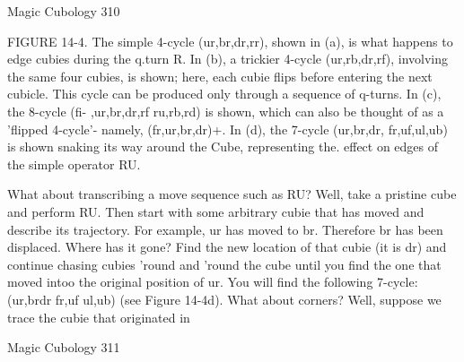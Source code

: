 Magic Cubology                                                                        310

FIGURE 14-4. The simple 4-cycle (ur,br,dr,rr), shown in (a), is what happens to edge
cubies during the q.turn R. In (b), a trickier 4-cycle (ur,rb,dr,rf), involving the same
four cubies, is shown; here, each cubie flips before entering the next cubicle. This
cycle can be produced only through a sequence of q-turns. In (c), the 8-cycle (fi-
,ur,br,dr,rf ru,rb,rd) is shown, which can also be thought of as a 'flipped 4-cycle'-
namely, (fr,ur,br,dr)+. In (d), the 7-cycle (ur,br,dr, fr,uf,ul,ub) is shown snaking its
way around the Cube, representing the. effect on edges of the simple operator RU.

        What about transcribing a move sequence such as RU? Well, take a pristine
cube and perform RU. Then start with some arbitrary cubie that has moved and
describe its trajectory. For example, ur has moved to br. Therefore br has been
displaced. Where has it gone? Find the new location of that cubie (it is dr) and
continue chasing cubies 'round and 'round the cube until you find the one that moved
intoo the original position of ur. You will find the following 7-cycle: (ur,brdr fr,uf
ul,ub) (see Figure 14-4d).
        What about corners? Well, suppose we trace the cubie that originated in




Magic Cubology                                                                      311

